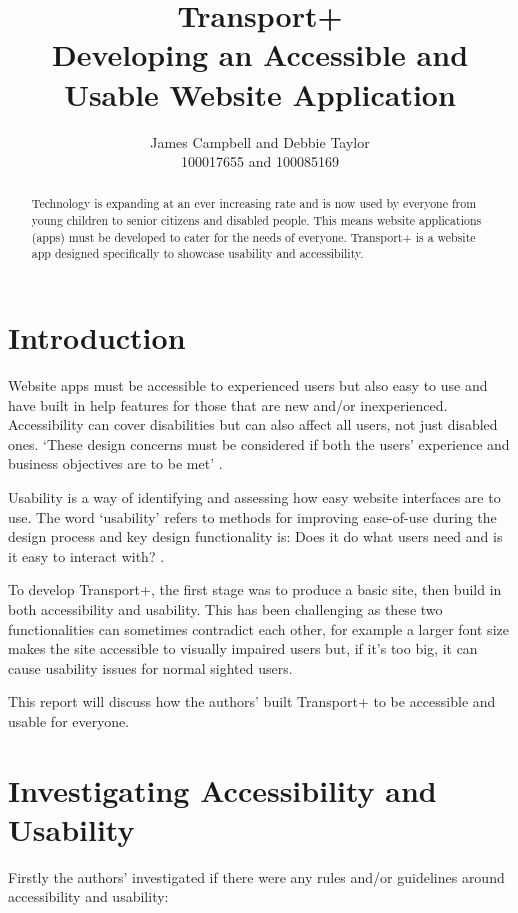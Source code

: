 \documentclass{ueacmpstyle}
\begin{document}
\title{Transport+ \\ Developing an Accessible and Usable Website Application }

\author{
James Campbell and Debbie Taylor \\ 100017655 and 100085169
}

\maketitle

\begin{abstract}
	Technology is expanding at an ever increasing rate and is now used by everyone from young children to senior citizens and disabled people. This means website applications (apps) must be developed to cater for the needs of everyone. Transport+ is a website app designed specifically to showcase usability and accessibility.
\end{abstract}

\section{Introduction} 
Website apps must be accessible to experienced users but also easy to use and have built in help features for those that are new and/or inexperienced. Accessibility can cover disabilities but can also affect all users, not just disabled ones. `These design concerns must be considered if both the users' experience and business objectives are to be met' \citep{petrie2004tension}.
 
Usability is a way of identifying and assessing how easy website interfaces are to use. The word `usability' refers to methods for improving ease-of-use during the design process and key design functionality is: Does it do what users need and is it easy to interact with? \citep{lee2012understanding}.

To develop Transport+, the first stage was to produce a basic site, then build in both accessibility and usability. This has been challenging as these two functionalities can sometimes contradict each other, for example a larger font size makes the site accessible to visually impaired users but, if it's too big, it can cause usability issues for normal sighted users. 

This report will discuss how the authors' built Transport+ to be accessible and usable for everyone.

\section{Investigating Accessibility and Usability}
Firstly the authors' investigated if there were any rules and/or guidelines around accessibility and usability:
\end{document}
